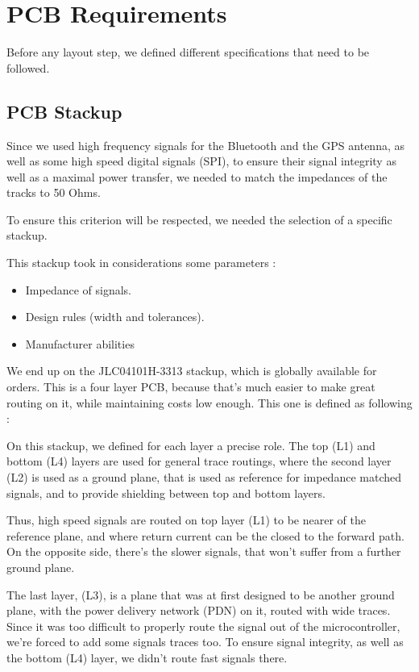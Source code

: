 \section{PCB Requirements}
Before any layout step, we defined different specifications that need to be
followed.

\subsection{PCB Stackup}
Since we used high frequency signals for the Bluetooth and the GPS antenna, as
well as some high speed digital signals (SPI), to ensure their signal integrity
as well as a maximal power transfer, we needed to match the impedances of the
tracks to 50 Ohms.

To ensure this criterion will be respected, we needed the selection of a
specific stackup.

This stackup took in considerations some parameters :
\begin{itemize}[noitemsep]
    \item   Impedance of signals.
    \item   Design rules (width and tolerances).
    \item   Manufacturer abilities
\end{itemize}

We end up on the JLC04101H-3313 stackup, which is globally available for
orders. This is a four layer PCB, because that's much easier to make great
routing on it, while maintaining costs low enough. This one is defined as
following :



On this stackup, we defined for each layer a precise role. The top (L1) and
bottom (L4) layers are used for general trace routings, where the second layer
(L2) is used as a ground plane, that is used as reference for impedance matched
signals, and to provide shielding between top and bottom layers.

Thus, high speed signals are routed on top layer (L1) to be nearer of the
reference plane, and where return current can be the closed to the forward
path. On the opposite side, there's the slower signals, that won't suffer from
a further ground plane.

The last layer, (L3), is a plane that was at first designed to be another
ground plane, with the power delivery network (PDN) on it, routed with wide
traces. Since it was too difficult to properly route the signal out of the
microcontroller, we're forced to add some signals traces too. To ensure signal
integrity, as well as the bottom (L4) layer, we didn't route fast signals
there.

